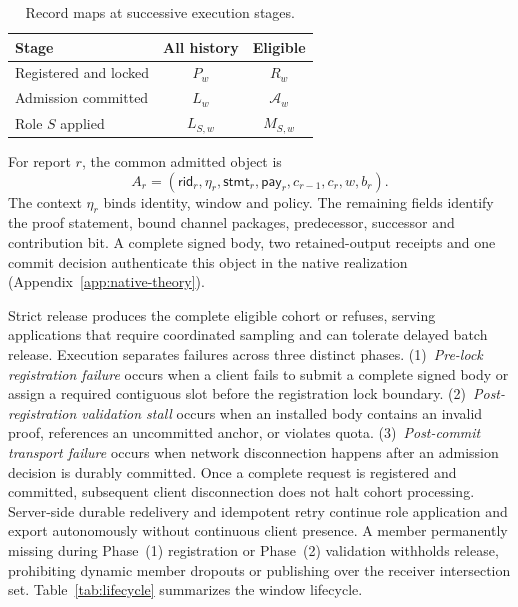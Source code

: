\documentclass[conference,compsoc]{IEEEtran}
\theoremstyle{definition}
\numberwithin{equation}{section}
\numberwithin{table}{section}
\numberwithin{figure}{section}
\theoremstyle{plain}
\begin{document}
\begin{table}[t]
\centering
\caption{Record maps at successive execution stages.}
\label{tab:record-types}
\footnotesize
\renewcommand{\arraystretch}{1.08}
\begin{tabular*}{\columnwidth}{@{\extracolsep{\fill}}lcc@{}}
\toprule
\textbf{Stage} & \textbf{All history} & \textbf{Eligible} \\
\midrule
Registered and locked & \(P_w\) & \(R_w\) \\
Admission committed & \(L_w\) & \(\mathcal A_w\) \\
Role \(S\) applied & \(L_{S,w}\) & \(M_{S,w}\) \\
\bottomrule
\end{tabular*}
\end{table}

For report \(r\), the common admitted object is
\begin{equation}
  A_r=(\mathsf{rid}_r,\eta_r,\mathsf{stmt}_r,\mathsf{pay}_r,
       c_{r-1},c_r,w,b_r).
  \label{eq:admission-object}
\end{equation}
The context \(\eta_r\) binds identity, window and policy. The remaining fields
identify the proof statement, bound channel packages, predecessor, successor
and contribution bit. A complete signed body, two retained-output receipts and
one commit decision authenticate this object in the native realization
(Appendix~\ref{app:native-theory}).

Strict release produces the complete eligible cohort or refuses, serving applications
that require coordinated sampling and can tolerate delayed batch release. Execution separates
failures across three distinct phases.
(1)~\emph{Pre-lock registration failure} occurs when a client fails to submit a complete signed
body or assign a required contiguous slot before the registration lock boundary.
(2)~\emph{Post-registration validation stall} occurs when an installed body contains an invalid
proof, references an uncommitted anchor, or violates quota.
(3)~\emph{Post-commit transport failure} occurs when network disconnection happens after an admission
decision is durably committed.
Once a complete request is registered and committed, subsequent client
disconnection does not halt cohort processing. Server-side durable redelivery and idempotent retry
continue role application and export autonomously without continuous client presence.
A member permanently missing during Phase~(1) registration or Phase~(2) validation withholds release,
prohibiting dynamic member dropouts or publishing over the receiver intersection set.
Table~\ref{tab:lifecycle} summarizes the window lifecycle.
\end{document}
